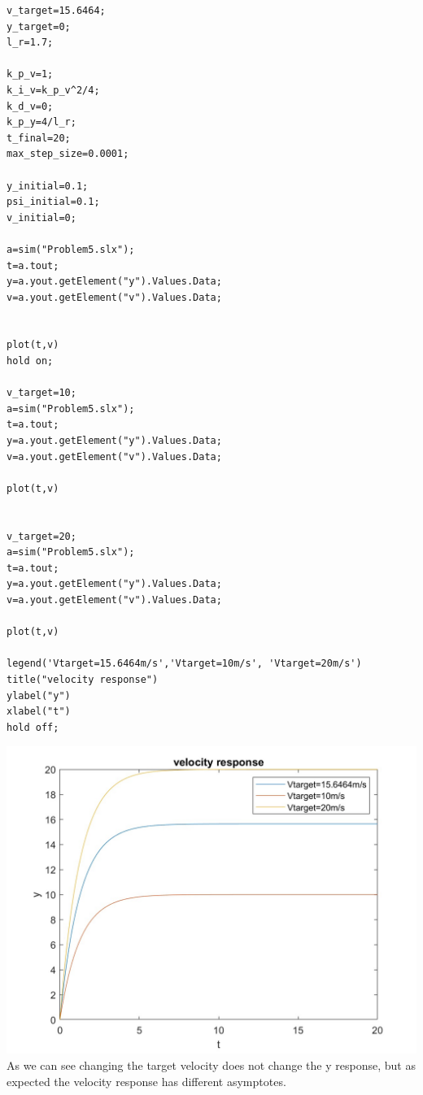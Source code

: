 \documentclass[12pt]{article}
\begin{document}
\begin{verbatim}
v_target=15.6464;
y_target=0;
l_r=1.7;

k_p_v=1;
k_i_v=k_p_v^2/4;
k_d_v=0;
k_p_y=4/l_r;
t_final=20;
max_step_size=0.0001;

y_initial=0.1;
psi_initial=0.1;
v_initial=0;

a=sim("Problem5.slx");
t=a.tout;
y=a.yout.getElement("y").Values.Data;
v=a.yout.getElement("v").Values.Data;


plot(t,v)
hold on;

v_target=10;
a=sim("Problem5.slx");
t=a.tout;
y=a.yout.getElement("y").Values.Data;
v=a.yout.getElement("v").Values.Data;
 
plot(t,v)


v_target=20;
a=sim("Problem5.slx");
t=a.tout;
y=a.yout.getElement("y").Values.Data;
v=a.yout.getElement("v").Values.Data;

plot(t,v)

legend('Vtarget=15.6464m/s','Vtarget=10m/s', 'Vtarget=20m/s')
title("velocity response")
ylabel("y")
xlabel("t")
hold off;
\end{verbatim}
\includegraphics[scale=0.3]{Problem6v.jpg}\\
As we can see changing the target velocity does not change the y response, but as expected the velocity response has different asymptotes.
\end{document}
